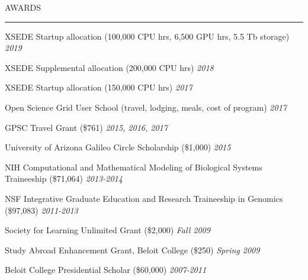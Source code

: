 \documentclass{resume} %
\renewenvironment{rSection}[1]{
\sectionskip
\textcolor{RoyalPurple}{\MakeUppercase{#1}}
\sectionlineskip
\hrule
\begin{list}{}{
\setlength{\leftmargin}{1.5em}
}
\item[]
}{
\end{list}
}
\begin{document}
\begin{rSection}{Awards}

\item XSEDE Startup allocation (100,000 CPU hrs, 6,500 GPU hrs, 5.5 Tb storage) \hfill{\em 2019}
\item XSEDE Supplemental allocation (200,000 CPU hrs) \hfill{\em 2018}
\item XSEDE Startup allocation (150,000 CPU hrs) \hfill{\em 2017}
\item Open Science Grid User School (travel, lodging, meals, cost of program) \hfill{\em 2017}
\item GPSC Travel Grant (\$761) \hfill{\em 2015, 2016, 2017} 
\item University of Arizona Galileo Circle Scholarship (\$1,000) \hfill{\em 2015} 
\item NIH Computational and Mathematical Modeling of Biological Systems Traineeship (\$71,064) \hfill {\em 2013-2014}
\item NSF Integrative Graduate Education and Research Traineeship in Genomics (\$97,083) \hfill {\em 2011-2013}
\item Society for Learning Unlimited Grant (\$2,000) \hfill {\em Fall 2009}
\item Study Abroad Enhancement Grant, Beloit College (\$250) \hfill {\em Spring 2009}
\item Beloit College Presidential Scholar (\$60,000) \hfill {\em 2007-2011}

\end{rSection}

\end{document}

